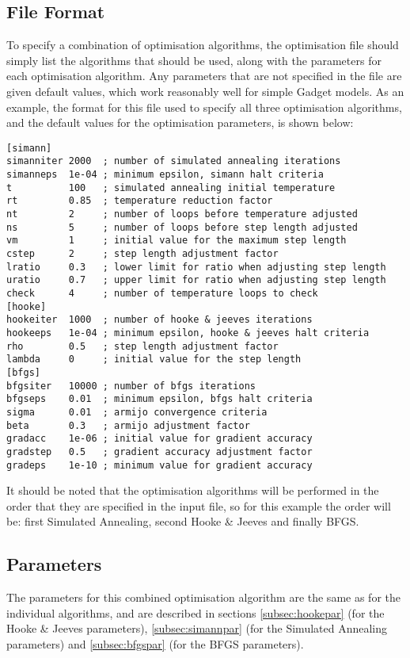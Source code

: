 \documentclass[10pt,twoside]{book}
\begin{document}
\subsection{File Format}\label{subsec:combinefile}
To specify a combination of optimisation algorithms, the optimisation file should simply list the algorithms that should be used, along with the parameters for each optimisation algorithm.  Any parameters that are not specified in the file are given default values, which work reasonably well for simple Gadget models.  As an example, the format for this file used to specify all three optimisation algorithms, and the default values for the optimisation parameters, is shown below:

{\small\begin{verbatim}
[simann]
simanniter 2000  ; number of simulated annealing iterations
simanneps  1e-04 ; minimum epsilon, simann halt criteria
t          100   ; simulated annealing initial temperature
rt         0.85  ; temperature reduction factor
nt         2     ; number of loops before temperature adjusted
ns         5     ; number of loops before step length adjusted
vm         1     ; initial value for the maximum step length
cstep      2     ; step length adjustment factor
lratio     0.3   ; lower limit for ratio when adjusting step length
uratio     0.7   ; upper limit for ratio when adjusting step length
check      4     ; number of temperature loops to check
[hooke]
hookeiter  1000  ; number of hooke & jeeves iterations
hookeeps   1e-04 ; minimum epsilon, hooke & jeeves halt criteria
rho        0.5   ; step length adjustment factor
lambda     0     ; initial value for the step length
[bfgs]
bfgsiter   10000 ; number of bfgs iterations
bfgseps    0.01  ; minimum epsilon, bfgs halt criteria
sigma      0.01  ; armijo convergence criteria
beta       0.3   ; armijo adjustment factor
gradacc    1e-06 ; initial value for gradient accuracy
gradstep   0.5   ; gradient accuracy adjustment factor
gradeps    1e-10 ; minimum value for gradient accuracy
\end{verbatim}}

It should be noted that the optimisation algorithms will be performed in the order that they are specified in the input file, so for this example the order will be: first Simulated Annealing, second Hooke \& Jeeves and finally BFGS.

\subsection{Parameters}\label{subsec:combinepar}
The parameters for this combined optimisation algorithm are the same as for the individual algorithms, and are described in sections \ref{subsec:hookepar} (for the Hooke \& Jeeves parameters), \ref{subsec:simannpar} (for the Simulated Annealing parameters) and \ref{subsec:bfgspar} (for the BFGS parameters).
\end{document}
